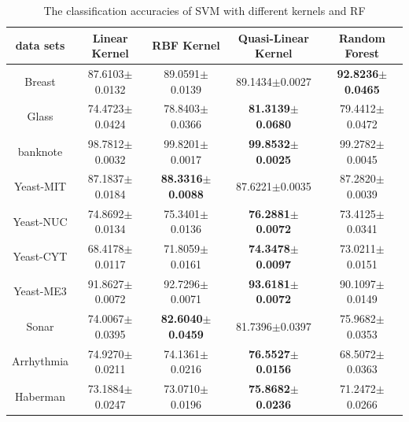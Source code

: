 \documentclass[master]{IPSstyle}
\begin{document}
{\begin{table}[H]
\renewcommand\arraystretch{1.2}
\centering \caption{The classification accuracies of SVM with different kernels and RF\label{table:1.2}}
\begin{tabular}{ c | c | c | c | c}
\hline
data sets & Linear Kernel& RBF Kernel& Quasi-Linear Kernel & Random Forest\\
 \hline\hline
Breast & 87.6103$\pm$0.0132 & 89.0591$\pm$0.0139 & 89.1434$\pm$0.0027 & \textbf{92.8236$\pm$0.0465} \\
Glass & 74.4723$\pm$0.0424 & 78.8403$\pm$0.0366 & \textbf{81.3139$\pm$0.0680} & 79.4412$\pm$0.0472\\
banknote & 98.7812$\pm$0.0032 & 99.8201$\pm$0.0017 & \textbf{99.8532$\pm$0.0025}& 99.2782$\pm$0.0045\\
Yeast-MIT & 87.1837$\pm$0.0184 & \textbf{88.3316$\pm$0.0088} & 87.6221$\pm$0.0035 & 87.2820$\pm$0.0039\\
Yeast-NUC & 74.8692$\pm$0.0134 & 75.3401$\pm$0.0136 & \textbf{76.2881$\pm$0.0072} &73.4125$\pm$0.0341\\
Yeast-CYT & 68.4178$\pm$0.0117 & 71.8059$\pm$0.0161 & \textbf{74.3478$\pm$0.0097} & 73.0211$\pm$0.0151\\
Yeast-ME3 & 91.8627$\pm$0.0072 & 92.7296$\pm$0.0071 & \textbf{93.6181$\pm$0.0072} &90.1097$\pm$0.0149\\
Sonar & 74.0067$\pm$0.0395 & \textbf{82.6040$\pm$0.0459} & 81.7396$\pm$0.0397 & 75.9682$\pm$0.0353\\
Arrhythmia & 74.9270$\pm$0.0211 & 74.1361$\pm$0.0216 & \textbf{76.5527$\pm$0.0156} &68.5072$\pm$0.0363\\
Haberman & 73.1884$\pm$0.0247 & 73.0710$\pm$0.0196 & \textbf{75.8682$\pm$0.0236} &71.2472$\pm$0.0266\\
\hline
\end{tabular}
\end{table}


}
\end{document}
